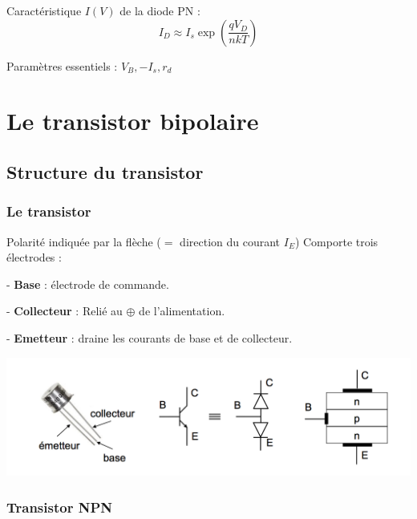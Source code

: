 \documentclass[]{article}
\begin{document}
Caractéristique $I(V)$ de la diode PN : $$ I_D \approx I_s \exp{(\frac{qV_D}{nkT})} $$

Paramètres essentiels : $V_B , - I_s, r_d$

\section{Le transistor bipolaire}
\subsection{Structure du transistor}
\subsubsection{Le transistor}
Polarité indiquée par la flèche ($=$ direction du courant $I_E$)
Comporte trois électrodes :

- \textbf{Base} : électrode de commande.

- \textbf{Collecteur} : Relié au $\oplus$ de l'alimentation.

- \textbf{Emetteur} : draine les courants de base et de collecteur.

\includegraphics[scale=0.6]{transistor.png} 

\subsubsection{Transistor NPN}
\end{document}
